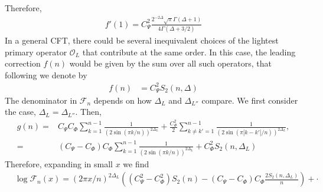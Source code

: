 \documentclass[11pt]{article}
\newcommand{\mO}{\mathcal{O}}
\newcommand{\nn}{\nonumber}
\newcommand{\lb}{\left(}
\newcommand{\rb}{\right)}
\newcommand{\JM}[1]{\textcolor{orange}{#1}}
\begin{document}
  Therefore,
  \begin{align}
    f'(1)=C^2_\Psi \frac{2^{-2\Delta}\sqrt{\pi}\Gamma(\Delta+1)}{4\Gamma(\Delta+3/2)}
  \end{align}
  In a general CFT, there could be several inequivalent choices of the lightest primary
  operator $\mO_{L}$ that contribute at the same order. In this case, the leading
  correction $f(n)$ would be given by the sum over all such operators, that
  following \cite{calabrese2011entanglement} we denote by
  \begin{align}
    f(n) & = C_\Psi^2 S_{2}(n,\Delta) 
  \end{align}
The denominator in $\mathcal{F}_n$ depends on how $\Delta_L$ and $\Delta_{L''}$ compare. We first consider the case, $\Delta_L=\Delta_{L''}$. Then,
  \begin{align}\label{gnw1}
    g(n)= & C_{\Psi}C_\Phi\sum_{k=1}^{n-1}\frac{1}{(2\sin(\pi k/n))^{2\Delta_L}}+\frac{C_\Phi^2}{2}\sum_{k\neq k'=1}^{n-1}\frac{1}{(2\sin(\pi |k-k'|/n))^{2\Delta_{L}}}, \nn\\%
    =&(C_\Psi -C_\Phi)C_\Phi\sum_{k=1}^{n-1}\frac{1}{(2\sin(\pi k/n))^{2\Delta_L}}+C_\Phi^2 S_2(n,\Delta_{L})
  \end{align}
Therefore, expanding in small $x$ we find
\begin{align}
  &\log\mathcal{F}_n(x)=(2\pi x/n)^{2\Delta_L}\lb(C_\Psi^2-C_\Phi^2)S_2(n)-(C_\Psi-C_\Phi)C_\Phi \frac{2S_2(n,\Delta_L)}{n}\rb+\cdot
\end{align}
\end{document}
